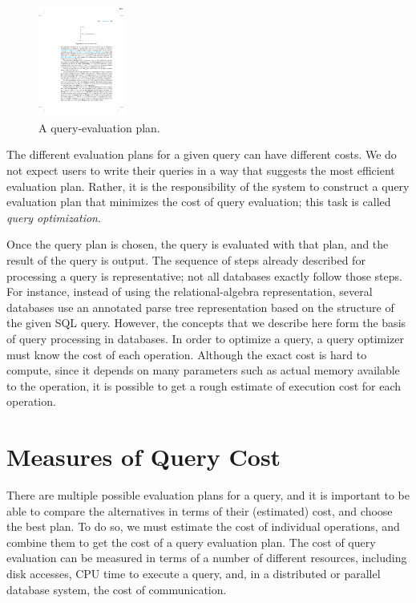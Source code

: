 \documentclass{vldb}
\begin{document}
\begin{figure}[htb]
\centering
\includegraphics[width=0.25\textwidth]{query}
\caption{A query-evaluation plan.}
\label{fig:query}
\end{figure}

The different evaluation plans for a given query can have different costs. 
We do not expect users to write their queries in a way that suggests the most efficient evaluation plan. 
Rather, it is the responsibility of the system to construct a query evaluation plan that minimizes the cost of query evaluation; this task is called
\textit{query optimization}.

Once the query plan is chosen, the query is evaluated with that plan, and the result of the query is output.
The sequence of steps already described for processing a query is representative;
not all databases exactly follow those steps. For instance, instead of using the relational-algebra representation, several databases use an annotated parse tree representation based on the structure of the given SQL query. 
However, the concepts that we describe here form the basis of query processing in databases.
In order to optimize a query, a query optimizer must know the cost of each operation. 
Although the exact cost is hard to compute, since it depends on many parameters such as actual memory available to the operation, it is possible to get a rough estimate of execution cost for each operation.

\section{Measures of Query Cost}

There are multiple possible evaluation plans for a query, and it is important to be able to compare the alternatives in terms of their (estimated) cost, and choose
the best plan. 
To do so, we must estimate the cost of individual operations, and combine them to get the cost of a query evaluation plan. 
The cost of query evaluation can be measured in terms of a number of different resources, including disk accesses, CPU time to execute a query, and, in
a distributed or parallel database system, the cost of communication.
\end{document}
